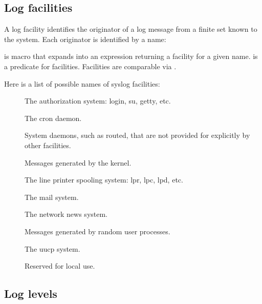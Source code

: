 \subsection*{Log facilities}

A log facility identifies the originator of a log message from a
finite set known to the system.  Each originator is identified by a
name:

\begin{protos}
\end{protos}
\noindent
{} is macro that expands into an expression
returning a facility for a given name.   is a
predicate for facilities.  Facilities are comparable via .

Here is a list of possible names of syslog facilities:

\begin{description}
\item[]
  The authorization system: login, su, getty, etc.

\item[]
  The cron daemon.

\item[]
  System daemons, such as routed, that are not provided for explicitly
  by other facilities.

\item[]
  Messages generated by the kernel.

\item[]
  The line printer spooling system: lpr, lpc, lpd, etc.

\item[]
  The mail system.

\item[]
  The network news system.

\item[]
  Messages generated by random user processes.

\item[]
  The uucp system.

\item[       ]
  Reserved for local use.
\end{description}

\subsection*{Log levels}


